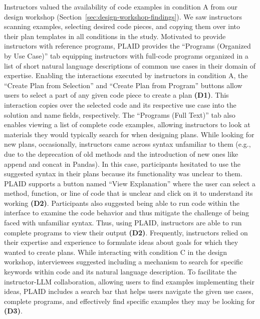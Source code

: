 Instructors valued the availability of code examples in condition A from our design workshop (Section~\ref{sec:design-workshop-findings}). We saw instructors scanning examples, selecting desired code pieces, and copying them over into their plan templates in all conditions in the study. Motivated to provide instructors with reference programs, PLAID provides the ``Programs (Organized by Use Case)'' tab equipping instructors with full-code programs organized in a list of short natural language descriptions of common use cases in their domain of expertise. Enabling the interactions executed by instructors in condition A, the ``Create Plan from Selection'' and ``Create Plan from Program'' buttons allow 
users to select a part of any given code piece to create a plan \textbf{(D1)}. This interaction copies over the selected code and its respective use case into the solution and name fields, respectively. The ``Programs (Full Text)'' tab also enables viewing a list of complete code examples, allowing instructors to look at materials they would typically search for when designing plans.
While looking for new plans, occasionally, instructors came across syntax unfamiliar to them (e.g., due to the deprecation of old methods and the introduction of new ones like append and concat in Pandas). In this case, participants hesitated to use the suggested syntax in their plans because its functionality was unclear to them. PLAID supports a button named ``View Explanation'' where the user can select a method, function, or line of code that is unclear and click on it to understand its working \textbf{(D2)}. 
Participants also suggested being able to run code within the interface to examine the code behavior and thus mitigate the challenge of being faced with unfamiliar syntax. Thus, using PLAID, instructors are able to run complete programs to view their output \textbf{(D2)}.
Frequently, instructors relied on their expertise and experience to formulate ideas about goals for which they wanted to create plans. While interacting with condition C in the design workshop, interviewees suggested including a mechanism to search for specific keywords within code and  its natural language description. To facilitate the instructor-LLM collaboration, allowing users to find examples implementing their ideas, PLAID includes a search bar that helps users navigate the given use cases, complete programs, and effectively find specific examples they may be looking for \textbf{(D3)}.

